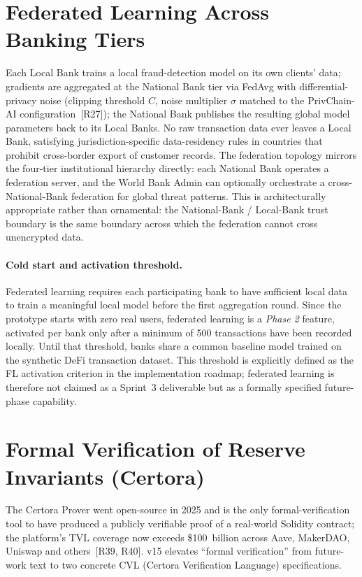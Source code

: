 \documentclass[12pt,a4paper]{report}
\begin{document}
\section{Federated Learning Across Banking Tiers}
\label{sec:fl-fraud}

Each Local Bank trains a local fraud-detection model on its own clients' data; gradients are aggregated at the National Bank tier via FedAvg with differential-privacy noise (clipping threshold $C$, noise multiplier $\sigma$ matched to the PrivChain-AI configuration~[R27]); the National Bank publishes the resulting global model parameters back to its Local Banks. No raw transaction data ever leaves a Local Bank, satisfying jurisdiction-specific data-residency rules in countries that prohibit cross-border export of customer records. The federation topology mirrors the four-tier institutional hierarchy directly: each National Bank operates a federation server, and the World Bank Admin can optionally orchestrate a cross-National-Bank federation for global threat patterns. This is architecturally appropriate rather than ornamental: the National-Bank / Local-Bank trust boundary is the same boundary across which the federation cannot cross unencrypted data.

\paragraph{Cold start and activation threshold.}
Federated learning requires each participating bank to have sufficient local data to train a meaningful local model before the first aggregation round. Since the prototype starts with zero real users, federated learning is a \textit{Phase 2} feature, activated per bank only after a minimum of 500 transactions have been recorded locally. Until that threshold, banks share a common baseline model trained on the synthetic DeFi transaction dataset. This threshold is explicitly defined as the FL activation criterion in the implementation roadmap; federated learning is therefore not claimed as a Sprint~3 deliverable but as a formally specified future-phase capability.

\section{Formal Verification of Reserve Invariants (Certora)}
\label{sec:certora}

The Certora Prover went open-source in 2025 and is the only formal-verification tool to have produced a publicly verifiable proof of a real-world Solidity contract; the platform's TVL coverage now exceeds \$100~billion across Aave, MakerDAO, Uniswap and others~[R39, R40]. v15 elevates ``formal verification'' from future-work text to two concrete CVL (Certora Verification Language) specifications.
\end{document}
